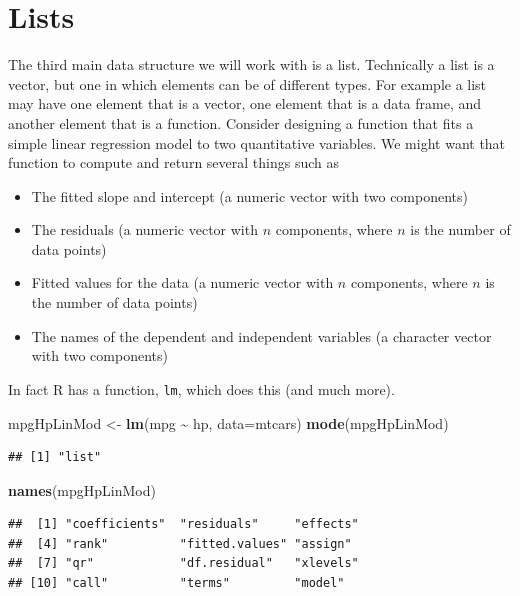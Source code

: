 \documentclass[
]{krantz}
\newenvironment{Shaded}{\begin{snugshade}}{\end{snugshade}}
\newcommand{\DataTypeTok}[1]{\textcolor[rgb]{0.13,0.29,0.53}{#1}}
\newcommand{\KeywordTok}[1]{\textcolor[rgb]{0.13,0.29,0.53}{\textbf{#1}}}
\newcommand{\NormalTok}[1]{#1}
\newcommand{\OperatorTok}[1]{\textcolor[rgb]{0.81,0.36,0.00}{\textbf{#1}}}
\newcommand{\StringTok}[1]{\textcolor[rgb]{0.31,0.60,0.02}{#1}}
\providecommand{\tightlist}{%
  \setlength{\itemsep}{0pt}\setlength{\parskip}{0pt}}
\begin{document}
\hypertarget{lists}{%
\section{Lists}\label{lists}}

The third main data structure we will work with is a list. Technically a list is a vector, but one in which elements can be of different types. For example a list may have one element that is a vector, one element that is a data frame, and another element that is a function. Consider designing a function that fits a simple linear regression model to two quantitative variables. We might want that function to compute and return several things such as

\begin{itemize}
\tightlist
\item
  The fitted slope and intercept (a numeric vector with two components)
\item
  The residuals (a numeric vector with \(n\) components, where \(n\) is the number of data points)
\item
  Fitted values for the data (a numeric vector with \(n\) components, where \(n\) is the number of data points)
\item
  The names of the dependent and independent variables (a character vector with two components)
\end{itemize}

In fact R has a function, \texttt{lm}, which does this (and much more).

\begin{Shaded}
\begin{Highlighting}[]
\NormalTok{mpgHpLinMod \textless{}{-}}\StringTok{ }\KeywordTok{lm}\NormalTok{(mpg }\OperatorTok{\textasciitilde{}}\StringTok{ }\NormalTok{hp, }\DataTypeTok{data=}\NormalTok{mtcars)}
\KeywordTok{mode}\NormalTok{(mpgHpLinMod)}
\end{Highlighting}
\end{Shaded}

\begin{verbatim}
## [1] "list"
\end{verbatim}

\begin{Shaded}
\begin{Highlighting}[]
\KeywordTok{names}\NormalTok{(mpgHpLinMod)}
\end{Highlighting}
\end{Shaded}

\begin{verbatim}
##  [1] "coefficients"  "residuals"     "effects"      
##  [4] "rank"          "fitted.values" "assign"       
##  [7] "qr"            "df.residual"   "xlevels"      
## [10] "call"          "terms"         "model"
\end{verbatim}
\end{document}
